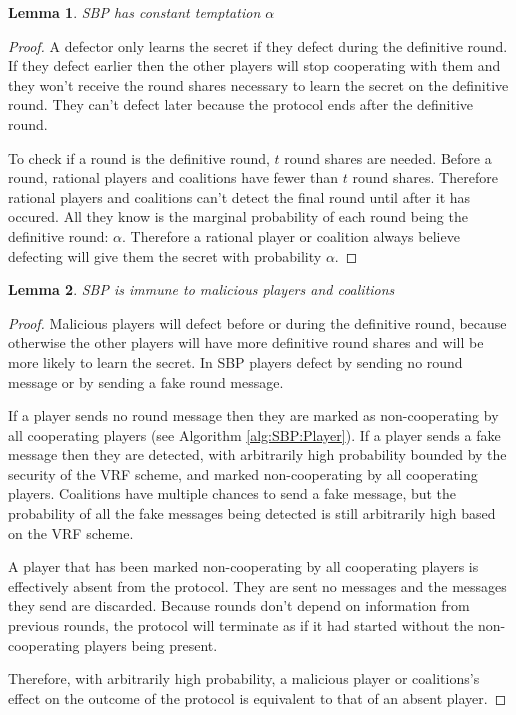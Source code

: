 \documentclass{dalcsthesis}
\newtheorem{lemma}{Lemma}
\begin{document}
\begin{lemma} SBP has constant temptation $\alpha$ \label{Lem:SBPConstTempt} \end{lemma}
\begin{proof}
A defector only learns the secret if they defect during the definitive round. If they defect earlier then the other players will stop cooperating with them and they won't receive the round shares necessary to learn the secret on the definitive round. They can't defect later because the protocol ends after the definitive round. 

To check if a round is the definitive round, $t$ round shares are needed. Before a round, rational players and coalitions have fewer than $t$ round shares. Therefore rational players and coalitions can't detect the final round until after it has occured. All they know is the marginal probability of each round being the definitive round: $\alpha$. Therefore a rational player or coalition always believe defecting will give them the secret with probability $\alpha$.
\end{proof}

\begin{lemma} SBP is immune to malicious players and coalitions \label{Lem:SBPMalImmune} \end{lemma}
\begin{proof}
Malicious players will defect before or during the definitive round, because otherwise the other players will have more definitive round shares and will be more likely to learn the secret. In SBP players defect by sending no round message or by sending a fake round message.

If a player sends no round message then they are marked as non-cooperating by all cooperating players (see Algorithm \ref{alg:SBP:Player}). If a player sends a fake message then they are detected, with arbitrarily high probability bounded by the security of the VRF scheme, and marked non-cooperating by all cooperating players. Coalitions have multiple chances to send a fake message, but the probability of all the fake messages being detected is still arbitrarily high based on the VRF scheme. 

A player that has been marked non-cooperating by all cooperating players is effectively absent from the protocol. They are sent no messages and the messages they send are discarded. Because rounds don't depend on information from previous rounds, the protocol will terminate as if it had started without the non-cooperating players being present.

Therefore, with arbitrarily high probability, a malicious player or coalitions's effect on the outcome of the protocol is equivalent to that of an absent player.
\end{proof}
\end{document}
